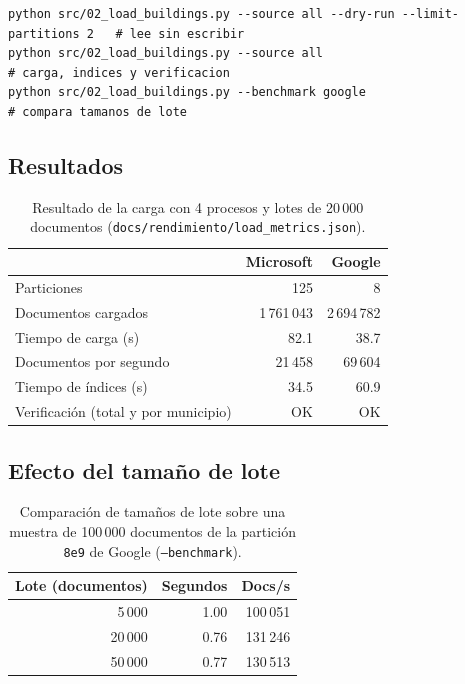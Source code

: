 \begin{lstlisting}[style=lab]
python src/02_load_buildings.py --source all --dry-run --limit-partitions 2   # lee sin escribir
python src/02_load_buildings.py --source all                                  # carga, indices y verificacion
python src/02_load_buildings.py --benchmark google                            # compara tamanos de lote
\end{lstlisting}

\subsection{Resultados}
\begin{table}[H]
\centering
\small
{}
\begin{tabularx}{\textwidth}{X r r}
\toprule
 & \textbf{Microsoft} & \textbf{Google} \\
\midrule
Particiones & 125 & 8 \\
Documentos cargados & 1\,761\,043 & 2\,694\,782 \\
Tiempo de carga (s) & 82.1 & 38.7 \\
Documentos por segundo & 21\,458 & 69\,604 \\
Tiempo de índices (s) & 34.5 & 60.9 \\
Verificación (total y por municipio) & OK & OK \\
\bottomrule
\end{tabularx}
\caption{Resultado de la carga con 4 procesos y lotes de 20\,000 documentos (\texttt{docs/rendimiento/load\_metrics.json}).}
\label{tab:carga_edificios}
\end{table}

\subsection{Efecto del tamaño de lote}
\begin{table}[H]
\centering
\small
{}
\begin{tabular}{r r r}
\toprule
\textbf{Lote (documentos)} & \textbf{Segundos} & \textbf{Docs/s} \\
\midrule
5\,000 & 1.00 & 100\,051 \\
20\,000 & 0.76 & 131\,246 \\
50\,000 & 0.77 & 130\,513 \\
\bottomrule
\end{tabular}
\caption{Comparación de tamaños de lote sobre una muestra de 100\,000 documentos de la partición \texttt{8e9} de Google (\texttt{--benchmark}).}
\label{tab:benchmark_lote}
\end{table}

